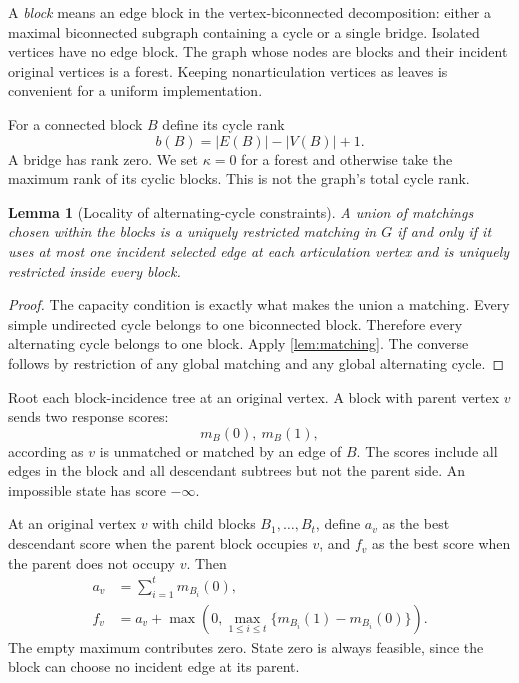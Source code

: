 \documentclass[11pt,letterpaper]{article}
\newtheorem{lemma}[lemma]{Lemma}\aliascntresetthe{lemma}
\theoremstyle{definition}
\theoremstyle{remark}
\newcommand{\negInf}{-\infty}
\begin{document}
A \emph{block} means an edge block in the vertex-biconnected decomposition: either a maximal biconnected subgraph containing a cycle or a single bridge. Isolated vertices have no edge block. The graph whose nodes are blocks and their incident original vertices is a forest. Keeping nonarticulation vertices as leaves is convenient for a uniform implementation.

For a connected block $B$ define its cycle rank
\[
 b(B)=|E(B)|-|V(B)|+1.
\]
A bridge has rank zero. We set $\kappa=0$ for a forest and otherwise take the maximum rank of its cyclic blocks. This is not the graph's total cycle rank.

\begin{lemma}[Locality of alternating-cycle constraints]
\label{lem:blocklocal}
A union of matchings chosen within the blocks is a uniquely restricted matching in $G$ if and only if it uses at most one incident selected edge at each articulation vertex and is uniquely restricted inside every block.
\end{lemma}
\begin{proof}
The capacity condition is exactly what makes the union a matching. Every simple undirected cycle belongs to one biconnected block. Therefore every alternating cycle belongs to one block. Apply \cref{lem:matching}. The converse follows by restriction of any global matching and any global alternating cycle.
\end{proof}

Root each block-incidence tree at an original vertex. A block with parent vertex $v$ sends two response scores:
\[
 m_B(0),\ m_B(1),
\]
according as $v$ is unmatched or matched by an edge of $B$. The scores include all edges in the block and all descendant subtrees but not the parent side. An impossible state has score $\negInf$.

At an original vertex $v$ with child blocks $B_1,\ldots,B_t$, define $a_v$ as the best descendant score when the parent block occupies $v$, and $f_v$ as the best score when the parent does not occupy $v$. Then
\begin{align}
 a_v&=\sum_{i=1}^t m_{B_i}(0),\label{eq:occupied}\\
 f_v&=a_v+\max\left(0,\max_{1\le i\le t}
           \{m_{B_i}(1)-m_{B_i}(0)\}\right).
 \label{eq:free}
\end{align}
The empty maximum contributes zero. State zero is always feasible, since the block can choose no incident edge at its parent.
\end{document}
